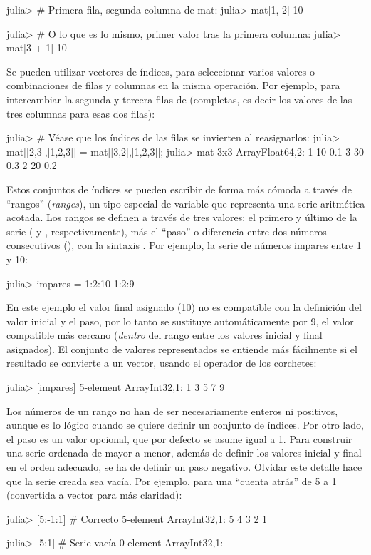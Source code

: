 ﻿\documentclass[spanish]{article}
\begin{document}
julia> # Primera fila, segunda columna de mat:
julia> mat[1, 2]
10

julia> # O lo que es lo mismo, primer valor tras la primera columna:
julia> mat[3 + 1]
10

Se pueden utilizar vectores de índices, para seleccionar varios valores o combinaciones de filas y columnas en la misma operación. Por ejemplo, para intercambiar la segunda y tercera filas de  (completas, es decir los valores de las tres columnas para esas dos filas):

julia> # Véase que los índices de las filas se invierten al reasignarlos:
julia> mat[[2,3],[1,2,3]] = mat[[3,2],[1,2,3]];
julia> mat
3x3 Array{Float64,2}:
 1 10 0.1
 3 30 0.3
 2 20 0.2

Estos conjuntos de índices se pueden escribir de forma más cómoda a través de ``rangos'' (\emph{ranges}), un tipo especial de variable que representa una serie aritmética acotada. Los rangos se definen a través de tres valores: el primero y último de la serie ( y , respectivamente), más el ``paso'' o diferencia entre dos números consecutivos (), con la sintaxis . Por ejemplo, la serie de números impares entre 1 y 10:

julia> impares = 1:2:10
1:2:9

En este ejemplo el valor final asignado (10) no es compatible con la definición del valor inicial y el paso, por lo tanto se sustituye automáticamente por 9, el valor compatible más cercano (\emph{dentro} del rango entre los valores inicial y final asignados). El conjunto de valores representados se entiende más fácilmente si el resultado se convierte a un vector, usando el operador de los corchetes:

julia> [impares]
5-element Array{Int32,1}:
 1
 3
 5
 7
 9

Los números de un rango no han de ser necesariamente enteros ni positivos, aunque es lo lógico cuando se quiere definir un conjunto de índices. Por otro lado, el paso  es un valor opcional, que por defecto se asume igual a 1. Para construir una serie ordenada de mayor a menor, además de definir los valores inicial y final en el orden adecuado, se ha de definir un paso negativo. Olvidar este detalle hace que la serie creada sea vacía. Por ejemplo, para una ``cuenta atrás'' de 5 a 1 (convertida a vector para más claridad):

julia> [5:-1:1] # Correcto
5-element Array{Int32,1}:
 5
 4
 3
 2
 1 

julia> [5:1] # Serie vacía
0-element Array{Int32,1}:
\end{document}
